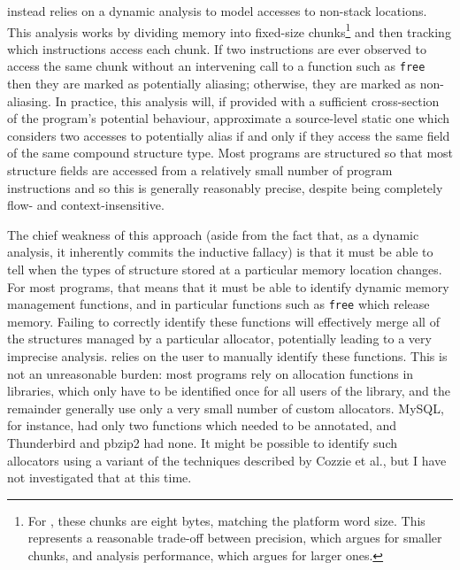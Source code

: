 {\Technique} instead relies on a dynamic analysis to model accesses to
non-stack locations.  This analysis works by dividing memory into
fixed-size chunks\footnote{For {\implementation}, these chunks are
  eight bytes, matching the platform word size. This represents a
  reasonable trade-off between precision, which argues for smaller
  chunks, and analysis performance, which argues for larger ones.} and
then tracking which instructions access each chunk.  If two
instructions are ever observed to access the same chunk without an
intervening call to a function such as \texttt{free} then they are
marked as potentially aliasing; otherwise, they are marked as
non-aliasing.  In practice, this analysis will, if provided with a
sufficient cross-section of the program's potential behaviour,
approximate a source-level static one which considers two accesses to
potentially alias if and only if they access the same field of the
same compound structure type.  Most programs are structured so that
most structure fields are accessed from a relatively small number of
program instructions and so this is generally reasonably precise,
despite being completely flow- and context-insensitive.

The chief weakness of this approach (aside from the fact that, as a
dynamic analysis, it inherently commits the inductive fallacy) is that
it must be able to tell when the types of structure stored at a
particular memory location changes.  For most programs, that means
that it must be able to identify dynamic memory management functions,
and in particular functions such as \texttt{free} which release
memory.  Failing to correctly identify these functions will
effectively merge all of the structures managed by a particular
allocator, potentially leading to a very imprecise analysis.
{\Technique} relies on the user to manually identify these functions.
This is not an unreasonable burden: most programs rely on allocation
functions in libraries, which only have to be identified once for all
users of the library, and the remainder generally use only a very
small number of custom allocators.  MySQL, for instance, had only two
functions which needed to be annotated, and Thunderbird and pbzip2 had
none.  It might be possible to identify such allocators using a
variant of the techniques described by Cozzie et al.\cite{Cozzie2008},
but I have not investigated that at this time.

